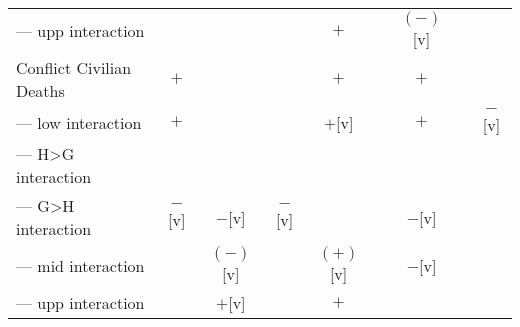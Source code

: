 \begin{landscape}
\begin{table}[!htbp]
\begin{tabular}{lcccccccc}
--- upp interaction      &            &          &          & $+$      &        & $(-)$[v]          &               & \\
Conflict Civilian Deaths & $+$        &          &          & $+$      &        & $+$               &               & \\
--- low interaction      & $+$        &          &          & $+$[v]   &        & $+$               &               & $-$[v] \\
--- H>G interaction      &            &          &          &          &        &                   &               & \\
--- G>H interaction      & $-$[v]     & $-$[v]   & $-$[v]   &          &        & $-$[v]            &               & \\
--- mid interaction      &            & $(-)$[v] &          & $(+)$[v] &        & $-$[v]            &               & \\
--- upp interaction      &            & $+$[v]   &          & $+$      &        &                   &               & \\
\bottomrule
\end{tabular}
\end{table}
\end{landscape}
